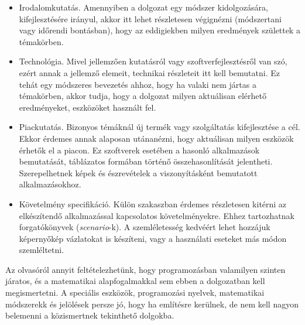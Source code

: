 \begin{itemize}
\item Irodalomkutatás. Amennyiben a dolgozat egy módszer kidolgozására, kifejlesztésére irányul, akkor itt lehet részletesen végignézni (módszertani vagy időrendi bontásban), hogy az eddigiekben milyen eredmények születtek a témakörben.
\item Technológia. Mivel jellemzően kutatásról vagy szoftverfejlesztésről van szó, ezért annak a jellemző elemeit, technikai részleteit itt kell bemutatni.
Ez tehát egy módszeres bevezetés ahhoz, hogy ha valaki nem jártas a témakörben, akkor tudja, hogy a dolgozat milyen aktuálisan elérhető eredményeket, eszközöket használt fel.
\item Piackutatás. Bizonyos témáknál új termék vagy szolgáltatás kifejlesztése a cél.
Ekkor érdemes annak alaposan utánanézni, hogy aktuálisan milyen eszközök érhetők el a piacon.
Ez szoftverek esetében a hasonló alkalmazások bemutatását, táblázatos formában történő összehasonlítását jelentheti.
Szerepelhetnek képek és észrevételek a viszonyításként bemutatott alkalmazásokhoz.
\item Követelmény specifikáció. Külön szakaszban érdemes részletesen kitérni az elkészítendő alkalmazással kapcsolatos követelményekre.
Ehhez tartozhatnak forgatókönyvek (\textit{scenario}-k).
A szemléletesség kedvéért lehet hozzájuk képernyőkép vázlatokat is készíteni, vagy a használati eseteket más módon szemléltetni.
\end{itemize}


Az olvasóról annyit feltételezhetünk, hogy programozásban valamilyen szinten járatos, és a matematikai alapfogalmakkal sem ebben a dolgozatban kell megismertetni.
A speciális eszközök, programozási nyelvek, matematikai módszerekk és jelölések persze jó, hogy ha említésre kerülnek, de nem kell nagyon belemenni a közismertnek tekinthető dolgokba.
